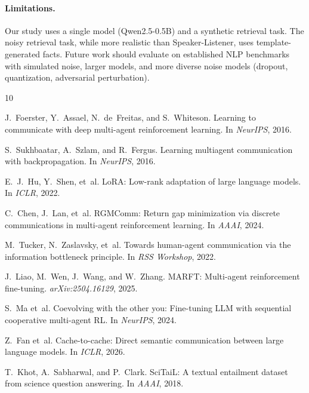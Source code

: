 \documentclass[11pt,a4paper]{article}
\begin{document}
\paragraph{Limitations.}
Our study uses a single model (Qwen2.5-0.5B) and a synthetic retrieval task. The noisy retrieval task, while more realistic than Speaker-Listener, uses template-generated facts. Future work should evaluate on established NLP benchmarks with simulated noise, larger models, and more diverse noise models (dropout, quantization, adversarial perturbation).


\begin{thebibliography}{10}

J.~Foerster, Y.~Assael, N.~de~Freitas, and S.~Whiteson.
\newblock Learning to communicate with deep multi-agent reinforcement learning.
\newblock In \emph{NeurIPS}, 2016.

S.~Sukhbaatar, A.~Szlam, and R.~Fergus.
\newblock Learning multiagent communication with backpropagation.
\newblock In \emph{NeurIPS}, 2016.

E.~J.~Hu, Y.~Shen, et~al.
\newblock LoRA: Low-rank adaptation of large language models.
\newblock In \emph{ICLR}, 2022.

C.~Chen, J.~Lan, et~al.
\newblock RGMComm: Return gap minimization via discrete communications in multi-agent reinforcement learning.
\newblock In \emph{AAAI}, 2024.

M.~Tucker, N.~Zaslavsky, et~al.
\newblock Towards human-agent communication via the information bottleneck principle.
\newblock In \emph{RSS Workshop}, 2022.

J.~Liao, M.~Wen, J.~Wang, and W.~Zhang.
\newblock MARFT: Multi-agent reinforcement fine-tuning.
\newblock \emph{arXiv:2504.16129}, 2025.

S.~Ma et~al.
\newblock Coevolving with the other you: Fine-tuning LLM with sequential cooperative multi-agent RL.
\newblock In \emph{NeurIPS}, 2024.

Z.~Fan et~al.
\newblock Cache-to-cache: Direct semantic communication between large language models.
\newblock In \emph{ICLR}, 2026.

T.~Khot, A.~Sabharwal, and P.~Clark.
\newblock SciTaiL: A textual entailment dataset from science question answering.
\newblock In \emph{AAAI}, 2018.

\end{thebibliography}
\end{document}
